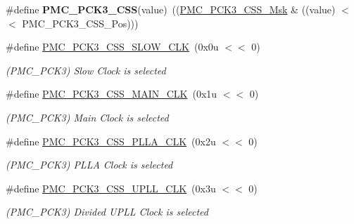 \begin{DoxyCompactItemize}
\#define {\bfseries P\+M\+C\+\_\+\+P\+C\+K3\+\_\+\+C\+SS}(value)~((\mbox{\hyperlink{group__SAMS70__PMC_gaad5ab9535efa702740966c5d64d19a59}{P\+M\+C\+\_\+\+P\+C\+K3\+\_\+\+C\+S\+S\+\_\+\+Msk}} \& ((value) $<$$<$ P\+M\+C\+\_\+\+P\+C\+K3\+\_\+\+C\+S\+S\+\_\+\+Pos)))
\item 
\mbox{\label{group__SAMS70__PMC_ga3f81bf3e1752b2a43a455dfa5a353244}} 
\#define \mbox{\hyperlink{group__SAMS70__PMC_ga3f81bf3e1752b2a43a455dfa5a353244}{P\+M\+C\+\_\+\+P\+C\+K3\+\_\+\+C\+S\+S\+\_\+\+S\+L\+O\+W\+\_\+\+C\+LK}}~(0x0u $<$$<$ 0)
\begin{DoxyCompactList}\small\item\em (P\+M\+C\+\_\+\+P\+C\+K3) Slow Clock is selected \end{DoxyCompactList}\item 
\mbox{\label{group__SAMS70__PMC_ga2fc53a6ce2011a06163559b3ac8be151}} 
\#define \mbox{\hyperlink{group__SAMS70__PMC_ga2fc53a6ce2011a06163559b3ac8be151}{P\+M\+C\+\_\+\+P\+C\+K3\+\_\+\+C\+S\+S\+\_\+\+M\+A\+I\+N\+\_\+\+C\+LK}}~(0x1u $<$$<$ 0)
\begin{DoxyCompactList}\small\item\em (P\+M\+C\+\_\+\+P\+C\+K3) Main Clock is selected \end{DoxyCompactList}\item 
\mbox{\label{group__SAMS70__PMC_ga5700692ca9c21655089da6aa5cfa3ad3}} 
\#define \mbox{\hyperlink{group__SAMS70__PMC_ga5700692ca9c21655089da6aa5cfa3ad3}{P\+M\+C\+\_\+\+P\+C\+K3\+\_\+\+C\+S\+S\+\_\+\+P\+L\+L\+A\+\_\+\+C\+LK}}~(0x2u $<$$<$ 0)
\begin{DoxyCompactList}\small\item\em (P\+M\+C\+\_\+\+P\+C\+K3) P\+L\+LA Clock is selected \end{DoxyCompactList}\item 
\mbox{\label{group__SAMS70__PMC_gad60e1a1b2ffbd829b516ed733c288137}} 
\#define \mbox{\hyperlink{group__SAMS70__PMC_gad60e1a1b2ffbd829b516ed733c288137}{P\+M\+C\+\_\+\+P\+C\+K3\+\_\+\+C\+S\+S\+\_\+\+U\+P\+L\+L\+\_\+\+C\+LK}}~(0x3u $<$$<$ 0)
\begin{DoxyCompactList}\small\item\em (P\+M\+C\+\_\+\+P\+C\+K3) Divided U\+P\+LL Clock is selected \end{DoxyCompactList}\item 
$$
\end{DoxyCompactItemize}
